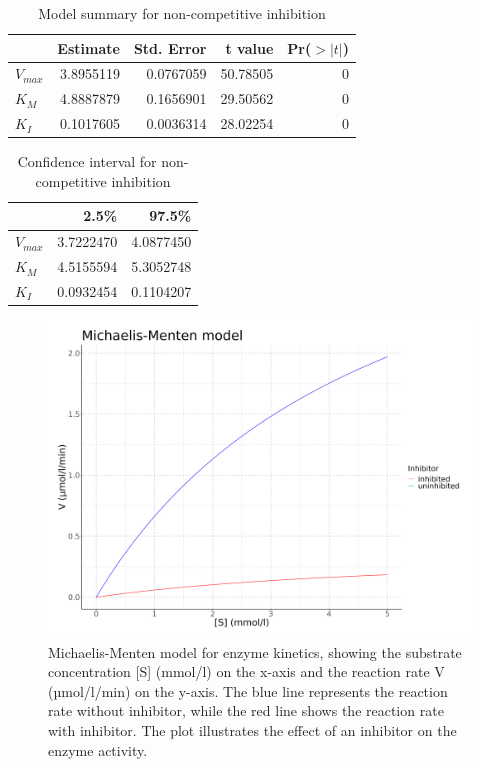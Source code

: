 \documentclass{article}
\begin{document}
\begin{table}[H]

    \caption{Model summary for non-competitive inhibition}
    \centering
    \begin{tabular}[t]{l|r|r|r|r}
        \hline
                  & Estimate  & Std. Error & t value  & Pr($>|t|$) \\
        \hline
        $V_{max}$ & 3.8955119 & 0.0767059  & 50.78505 & 0          \\
        \hline
        $K_{M}$   & 4.8887879 & 0.1656901  & 29.50562 & 0          \\
        \hline
        $K_{I}$   & 0.1017605 & 0.0036314  & 28.02254 & 0          \\
        \hline
    \end{tabular}
\end{table}

\begin{table}[H]

    \caption{Confidence interval for non-competitive inhibition}
    \centering
    \begin{tabular}[t]{l|r|r}
        \hline
                  & 2.5\%     & 97.5\%    \\
        \hline
        $V_{max}$ & 3.7222470 & 4.0877450 \\
        \hline
        $K_{M}$   & 4.5155594 & 5.3052748 \\
        \hline
        $K_{I}$   & 0.0932454 & 0.1104207 \\
        \hline
    \end{tabular}
\end{table}

\begin{figure}[H]
    \centering
    \includegraphics[width=1.0\textwidth, height=0.5\textheight]{plots/model_fit_plot2.png}
    \caption{Michaelis-Menten model for enzyme kinetics, showing the substrate concentration [S] (mmol/l)
        on the x-axis and the reaction rate V (µmol/l/min) on the y-axis. The blue line represents the reaction
        rate without inhibitor, while the red line shows the reaction rate with inhibitor. 
        The plot illustrates the effect of an inhibitor on the enzyme
        activity.}
    \label{fig:enzyme_kinetics}
\end{figure}
\end{document}
